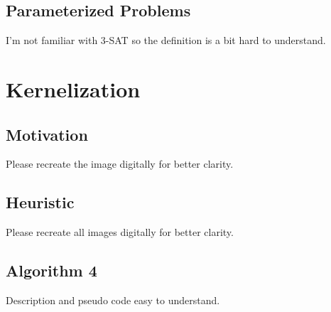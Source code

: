 \documentclass[11pt, a4paper]{article}
\begin{document}
\subsection{Parameterized Problems}
I'm not familiar with 3-SAT so the definition is a bit hard to understand.

\section{Kernelization}
\subsection{Motivation}
Please recreate the image digitally for better clarity.

\subsection{Heuristic}
Please recreate all images digitally for better clarity.

\subsection{Algorithm 4}
Description and pseudo code easy to understand.
\end{document}
